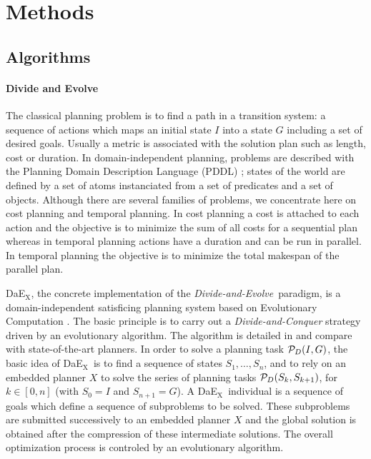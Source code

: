 \documentclass{sig-alternate}
\newcommand{\dae}{{\em Divide-and-Evolve}}
\newcommand{\DAEX}{{\sc DaE$_{\text{X}}$}}
\begin{document}
\section{Methods}

\subsection{Algorithms}

\paragraph{Divide and Evolve} %
The classical planning problem is to find a path in a transition system: a
sequence of actions which maps an initial state $I$ into a state $G$ including a
set of desired goals. Usually a metric is associated with the solution plan such
as length, cost or duration. In domain-independent planning, problems are
described with the Planning Domain Description Language (PDDL)
\cite{pddl:jair2003}; states of the world are defined by a set of atoms
instanciated from a set of predicates and a set of objects. Although there are
several families of problems, we concentrate here on cost planning and temporal
planning. In cost planning a cost is attached to each action and the objective
is to minimize the sum of all costs for a sequential plan whereas in temporal
planning actions have a duration and can be run in parallel. In temporal
planning the objective is to minimize the total makespan of the parallel plan.

\DAEX, the concrete implementation of the \dae\ paradigm, is a
domain-independent satisficing planning system based on Evolutionary Computation
\cite{dae:evocop2006}. The basic principle is to carry out a {\em
Divide-and-Conquer} strategy driven by an evolutionary algorithm. The algorithm
is detailed in \cite{dae:icaps2010} and compare with state-of-the-art planners.
In order to solve a planning task ${\cal P}_D(I,G)$, the basic idea of \DAEX\ is
to find a sequence of states $S_1, \ldots, S_n$, and to rely on an embedded
planner $X$ to solve the series of planning tasks ${\cal P}_D(S_{k},S_{k+1})$,
for $k \in [0,n]$ (with $S_0 = I$ and $S_{n+1} = G$).  A \DAEX\ individual is a
sequence of goals which define a sequence of subproblems to be solved. These
subproblems are submitted successively to an embedded planner $X$ and the global
solution is obtained after the compression of these intermediate solutions. The
overall optimization process is controled by an evolutionary algorithm.
\end{document}
